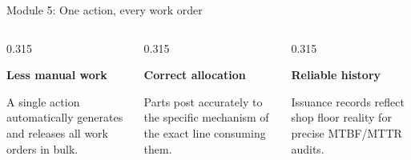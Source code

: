 \begin{frame}{Module 5: One action, every work order}
    \vspace{0.2cm}
    
    \begin{columns}[T]
        \begin{column}{0.315\textwidth}
            \begin{minimalcard}[height=2.3cm]
                {\fontsize{8.5}{10.5}\bfseries\selectfont\color{primary}Less manual work}\par
                \vspace{0.15cm}
                {\fontsize{7.5}{10}\selectfont\color{mutedgray}
                A single action automatically generates and releases all work orders in bulk.
                }
            \end{minimalcard}
        \end{column}
        
        \begin{column}{0.315\textwidth}
            \begin{minimalcard}[height=2.3cm]
                {\fontsize{8.5}{10.5}\bfseries\selectfont\color{primary}Correct allocation}\par
                \vspace{0.15cm}
                {\fontsize{7.5}{10}\selectfont\color{mutedgray}
                Parts post accurately to the specific mechanism of the exact line consuming them.
                }
            \end{minimalcard}
        \end{column}
        
        \begin{column}{0.315\textwidth}
            \begin{minimalcard}[height=2.3cm]
                {\fontsize{8.5}{10.5}\bfseries\selectfont\color{primary}Reliable history}\par
                \vspace{0.15cm}
                {\fontsize{7.5}{10}\selectfont\color{mutedgray}
                Issuance records reflect shop floor reality for precise MTBF/MTTR audits.
                }
            \end{minimalcard}
        \end{column}
    \end{columns}
\end{frame}
